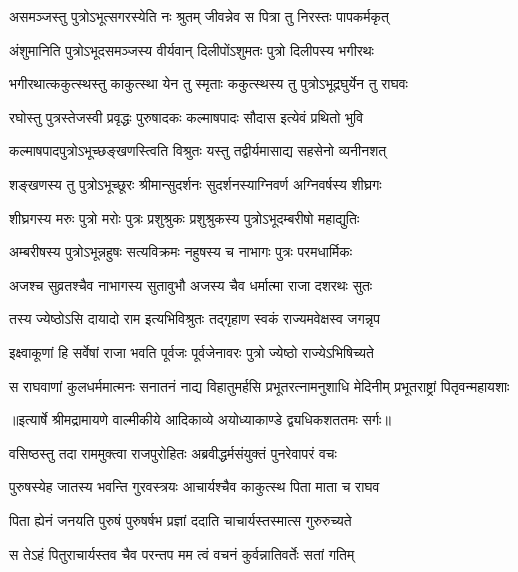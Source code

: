 \twolineshloka
{असमञ्जस्तु पुत्रोऽभूत्सगरस्येति नः श्रुतम्}
{जीवन्नेव स पित्रा तु निरस्तः पापकर्मकृत्} %

\twolineshloka
{अंशुमानिति पुत्रोऽभूदसमञ्जस्य वीर्यवान्}
{दिलीपोंऽशुमतः पुत्रो दिलीपस्य भगीरथः} %

\twolineshloka
{भगीरथात्ककुत्स्थस्तु काकुत्स्था येन तु स्मृताः}
{ककुत्स्थस्य तु पुत्रोऽभूद्रघुर्येन तु राघवः} %

\twolineshloka
{रघोस्तु पुत्रस्तेजस्वी प्रवृद्धः पुरुषादकः}
{कल्माषपादः सौदास इत्येवं प्रथितो भुवि} %

\twolineshloka
{कल्माषपादपुत्रोऽभूच्छङ्खणस्त्विति विश्रुतः}
{यस्तु तद्वीर्यमासाद्य सहसेनो व्यनीनशत्} %

\twolineshloka
{शङ्खणस्य तु पुत्रोऽभूच्छूरः श्रीमान्सुदर्शनः}
{सुदर्शनस्याग्निवर्ण अग्निवर्षस्य शीघ्रगः} %

\twolineshloka
{शीघ्रगस्य मरुः पुत्रो मरोः पुत्रः प्रशुश्रुकः}
{प्रशुश्रुकस्य पुत्रोऽभूदम्बरीषो महाद्युतिः} %

\twolineshloka
{अम्बरीषस्य पुत्रोऽभून्नहुषः सत्यविक्रमः}
{नहुषस्य च नाभागः पुत्रः परमधार्मिकः} %

\twolineshloka
{अजश्च सुव्रतश्चैव नाभागस्य सुतावुभौ}
{अजस्य चैव धर्मात्मा राजा दशरथः सुतः} %

\twolineshloka
{तस्य ज्येष्ठोऽसि दायादो राम इत्यभिविश्रुतः}
{तद्गृहाण स्वकं राज्यमवेक्षस्व जगन्नृप} %

\twolineshloka
{इक्ष्वाकूणां हि सर्वेषां राजा भवति पूर्वजः}
{पूर्वजेनावरः पुत्रो ज्येष्ठो राज्येऽभिषिच्यते} %

\fourlineindentedshloka
{स राघवाणां कुलधर्ममात्मनः}
{सनातनं नाद्य विहातुमर्हसि}
{प्रभूतरत्नामनुशाधि मेदिनीम्}
{प्रभूतराष्ट्रां पितृवन्महायशाः} %


{॥इत्यार्षे श्रीमद्रामायणे वाल्मीकीये आदिकाव्ये अयोध्याकाण्डे द्व्यधिकशततमः सर्गः॥}


\twolineshloka
{वसिष्ठस्तु तदा राममुक्त्वा राजपुरोहितः}
{अब्रवीद्धर्मसंयुक्तं पुनरेवापरं वचः} %

\twolineshloka
{पुरुषस्येह जातस्य भवन्ति गुरवस्त्रयः}
{आचार्यश्चैव काकुत्स्थ पिता माता च राघव} %

\twolineshloka
{पिता ह्येनं जनयति पुरुषं पुरुषर्षभ}
{प्रज्ञां ददाति चाचार्यस्तस्मात्स गुरुरुच्यते} %

\twolineshloka
{स तेऽहं पितुराचार्यस्तव चैव परन्तप}
{मम त्वं वचनं कुर्वन्नातिवर्तेः सतां गतिम्} %


